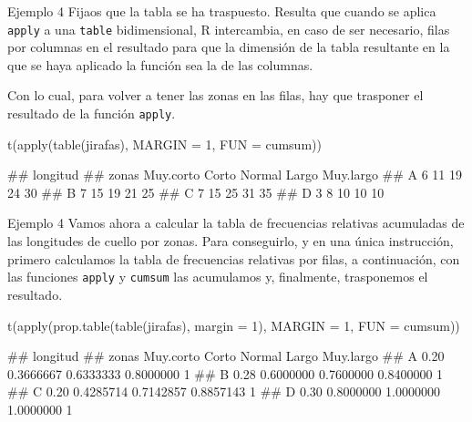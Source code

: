 \documentclass[
  ignorenonframetext,
  aspectratio=169]{beamer}
\newenvironment{Shaded}{\begin{snugshade}}{\end{snugshade}}
\newcommand{\AttributeTok}[1]{\textcolor[rgb]{0.77,0.63,0.00}{#1}}
\newcommand{\DecValTok}[1]{\textcolor[rgb]{0.00,0.00,0.81}{#1}}
\newcommand{\FunctionTok}[1]{\textcolor[rgb]{0.00,0.00,0.00}{#1}}
\newcommand{\NormalTok}[1]{#1}
\let\oldverbatim\verbatim
\let\endoldverbatim\endverbatim
\renewenvironment{verbatim}{\tiny\oldverbatim}{\endoldverbatim}
\begin{document}
\begin{frame}[fragile]{Ejemplo 4}
\protect\hypertarget{ejemplo-4-3}{}
Fijaos que la tabla se ha traspuesto. Resulta que cuando se aplica
\texttt{apply} a una \texttt{table} bidimensional, R intercambia, en
caso de ser necesario, filas por columnas en el resultado para que la
dimensión de la tabla resultante en la que se haya aplicado la función
sea la de las columnas.

Con lo cual, para volver a tener las zonas en las filas, hay que
trasponer el resultado de la función \texttt{apply}.

\begin{Shaded}
\begin{Highlighting}[]
\FunctionTok{t}\NormalTok{(}\FunctionTok{apply}\NormalTok{(}\FunctionTok{table}\NormalTok{(jirafas), }\AttributeTok{MARGIN =} \DecValTok{1}\NormalTok{, }\AttributeTok{FUN =}\NormalTok{ cumsum))}
\end{Highlighting}
\end{Shaded}

\begin{verbatim}
##      longitud
## zonas Muy.corto Corto Normal Largo Muy.largo
##     A         6    11     19    24        30
##     B         7    15     19    21        25
##     C         7    15     25    31        35
##     D         3     8     10    10        10
\end{verbatim}
\end{frame}

\begin{frame}[fragile]{Ejemplo 4}
\protect\hypertarget{ejemplo-4-4}{}
Vamos ahora a calcular la tabla de frecuencias relativas acumuladas de
las longitudes de cuello por zonas. Para conseguirlo, y en una única
instrucción, primero calculamos la tabla de frecuencias relativas por
filas, a continuación, con las funciones \texttt{apply} y
\texttt{cumsum} las acumulamos y, finalmente, trasponemos el resultado.

\begin{Shaded}
\begin{Highlighting}[]
\FunctionTok{t}\NormalTok{(}\FunctionTok{apply}\NormalTok{(}\FunctionTok{prop.table}\NormalTok{(}\FunctionTok{table}\NormalTok{(jirafas),}
                   \AttributeTok{margin =} \DecValTok{1}\NormalTok{), }
        \AttributeTok{MARGIN =} \DecValTok{1}\NormalTok{, }\AttributeTok{FUN =}\NormalTok{ cumsum))}
\end{Highlighting}
\end{Shaded}

\begin{verbatim}
##      longitud
## zonas Muy.corto     Corto    Normal     Largo Muy.largo
##     A      0.20 0.3666667 0.6333333 0.8000000         1
##     B      0.28 0.6000000 0.7600000 0.8400000         1
##     C      0.20 0.4285714 0.7142857 0.8857143         1
##     D      0.30 0.8000000 1.0000000 1.0000000         1
\end{verbatim}
\end{frame}
\end{document}
